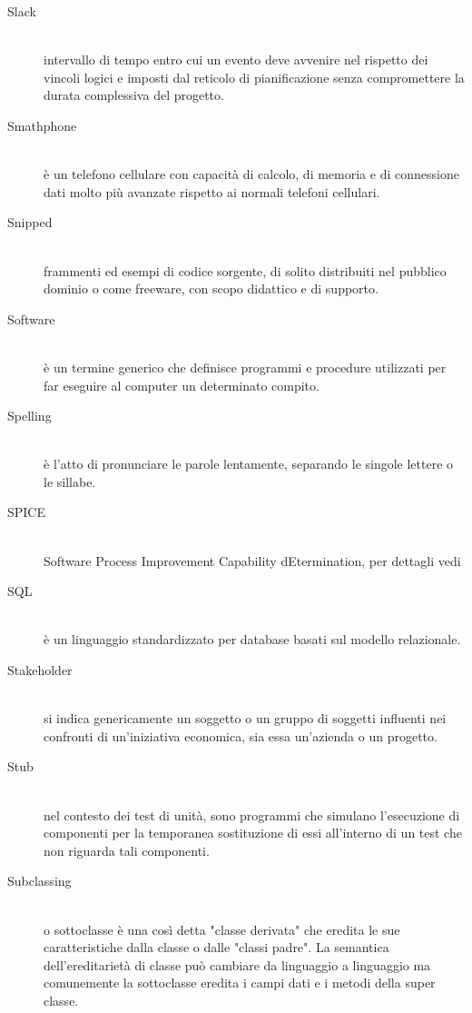 \documentclass[12pt,a4paper]{article}
\begin{document}
\begin{description}
\item[Slack] 
\hfill\\intervallo di tempo entro cui un evento deve avvenire nel rispetto dei vincoli logici e imposti dal reticolo di pianificazione senza compromettere la durata complessiva del progetto.

\item[Smathphone] 
\hfill\\è un telefono cellulare con capacità di calcolo, di memoria e di connessione dati molto più avanzate rispetto ai normali telefoni cellulari.

\item[Snipped] 
\hfill\\frammenti ed esempi di codice sorgente, di solito distribuiti nel pubblico dominio o come freeware, con scopo didattico e di supporto.

\item[Software] 
\hfill\\è un termine generico che definisce programmi e procedure utilizzati per far eseguire al computer un determinato compito.

\item[Spelling] 
\hfill\\è l'atto di pronunciare le parole lentamente, separando le singole lettere o le sillabe.

\item[SPICE] 
\hfill\\ Software Process Improvement Capability
dEtermination, per dettagli vedi \PdQ

\item[SQL] 
\hfill\\è un linguaggio standardizzato per database basati sul modello relazionale.

\item[Stakeholder] 
\hfill\\si indica genericamente un soggetto o un gruppo di soggetti influenti nei confronti di un'iniziativa economica, sia essa un'azienda o un progetto.

\item[Stub] 
\hfill\\nel contesto dei test di unità, sono programmi che simulano l'esecuzione di componenti  per la temporanea sostituzione di essi all'interno di un test  che non riguarda tali componenti.

\item[Subclassing] 
\hfill\\o sottoclasse è una così detta "classe derivata" che eredita le sue caratteristiche dalla classe o dalle "classi padre". La semantica dell'ereditarietà di classe può cambiare da linguaggio a linguaggio ma comunemente la sottoclasse eredita i campi dati e i metodi della super classe.


\end{description}
\end{document}
